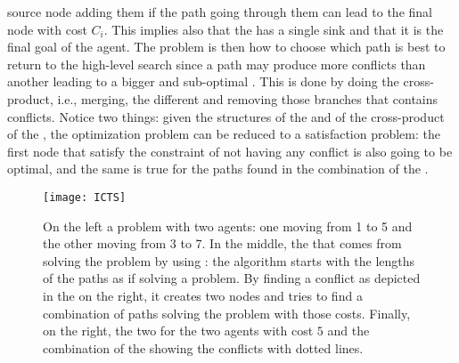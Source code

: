 source node adding them if the path going through them can lead to the final
node with cost $C_i$. This implies also that the  has a single sink
and that it is the final goal of the agent. \newline
The problem is then how to choose which path is best to return to the
high-level search since a path may produce more conflicts than another leading
to a bigger and sub-optimal . This is done by doing the
cross-product, i.e., merging, the different  and removing those
branches that contains conflicts. 
Notice two things: given the structures of the  and of the 
cross-product of the , the optimization problem can be reduced to a
satisfaction problem: the first  node that satisfy the constraint of
not having any conflict is also going to be optimal, and the same is true for
the paths found in the combination of the .
\begin{figure}[tb]
  \centering
  \texttt{[image: ICTS]}
  \caption{On the left a  problem with two agents: one moving from 1
  to 5 and the other moving from 3 to 7. In the middle, the  that
  comes from solving the problem by using : the algorithm starts
  with the lengths of the paths as if solving a  problem. By finding
  a conflict as depicted in the  on the right, it creates two nodes
  and tries to find a combination of paths solving the problem with those
  costs. Finally, on the right, the two  for the two agents with
  cost $5$ and the combination of the  showing the conflicts with
  dotted lines.}
  \label{fig:ICTS}
\end{figure}
%
